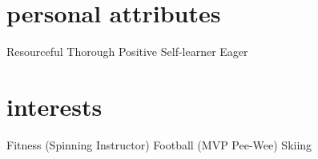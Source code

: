 \documentclass[]{friggeri-cv-mod} %
\begin{document}
\begin{aside}
\section{personal attributes}
Resourceful
Thorough
Positive
Self-learner
Eager
\section{interests}
Fitness (Spinning Instructor)
Football (MVP Pee-Wee)
Skiing
\end{aside}
\end{document}
